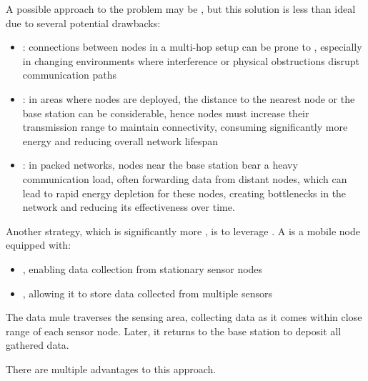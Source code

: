 \documentclass[a4paper, 12pt]{report}
\begin{document}
     A possible approach to the problem may be , but this solution is less than ideal due to several potential drawbacks:

    \begin{itemize}
        \item {}: connections between nodes in a multi-hop setup can be prone to , especially in changing environments where interference or physical obstructions disrupt communication paths
        \item {}: in areas where nodes are  deployed, the distance to the nearest node or the base station can be considerable, hence nodes must increase their transmission range to maintain connectivity, consuming significantly more energy and reducing overall network lifespan
        \item {}: in  packed networks, nodes near the base station bear a heavy communication load, often forwarding data from distant nodes, which can lead to rapid energy depletion for these nodes, creating bottlenecks in the network and reducing its effectiveness over time.
    \end{itemize}

    Another strategy, which is significantly more , is to leverage . A  is a mobile node equipped with:

    \begin{itemize}
        \item {}, enabling data collection from stationary sensor nodes
        \item {}, allowing it to store data collected from multiple sensors
    \end{itemize}

    The data mule traverses the sensing area, collecting data as it comes within close range of each sensor node. Later, it returns to the base station to deposit all gathered data.

    There are multiple advantages to this approach.
\end{document}
